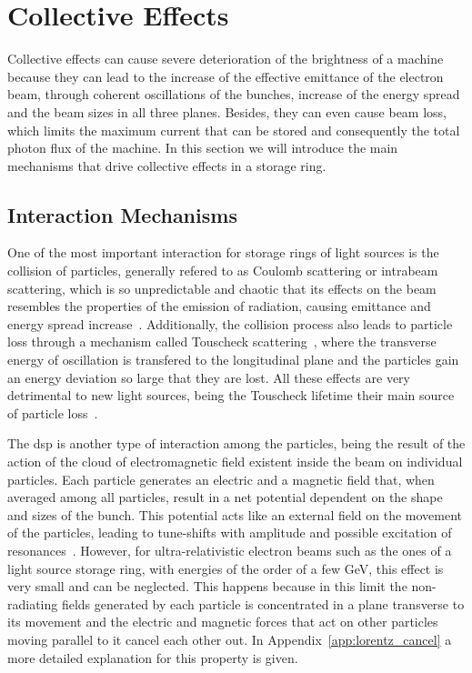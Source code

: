 \section{Collective Effects}

    Collective effects can cause severe deterioration of the brightness of a machine because they can lead to the increase of the effective emittance of the electron beam, through coherent oscillations of the bunches, increase of the energy spread and the beam sizes in all three planes. Besides, they can even cause beam loss, which limits the maximum current that can be stored and consequently the total photon flux of the machine. In this section we will introduce the main mechanisms that drive collective effects in a storage ring.

\subsection{Interaction Mechanisms}

    One of the most important interaction for storage rings of light sources is the collision of particles, generally refered to as Coulomb scattering or intrabeam scattering, which is so unpredictable and chaotic that its effects on the beam resembles the properties of the emission of radiation, causing emittance and energy spread increase~\cite{intrabeam_scaterring}. Additionally, the collision process also leads to particle loss through a mechanism called Touscheck scattering~\cite{touscheck_scatering}, where the transverse energy of oscillation is transfered to the longitudinal plane and the particles gain an energy deviation so large that they are lost. All these effects are very detrimental to new light sources, being the Touscheck lifetime their main source of particle loss~\cite{touscheck_lifetime}.

    The \gls{dsp} is another type of interaction among the particles, being the result of the action of the cloud of electromagnetic field existent inside the beam on individual particles. Each particle generates an electric and a magnetic field that, when averaged among all particles, result in a net potential dependent on the shape and sizes of the bunch. This potential acts like an external field on the movement of the particles, leading to tune-shifts with amplitude and possible excitation of resonances~\cite{direct_space_charge}. However, for ultra-relativistic electron beams such as the ones of a light source storage ring, with energies of the order of a few \si{\giga\electronvolt}, this effect is very small and can be neglected. This happens because in this limit the non-radiating fields generated by each particle is concentrated in a plane transverse to its movement and the electric and magnetic forces that act on other particles moving parallel to it cancel each other out. In Appendix~\ref{app:lorentz_cancel} a more detailed explanation for this property is given.

